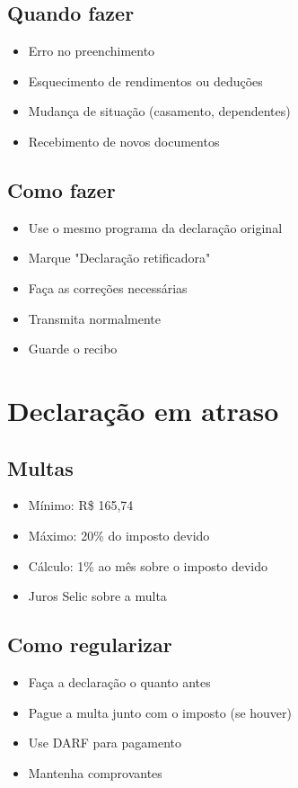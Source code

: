 \documentclass[12pt,a4paper]{article}
\begin{document}
\subsection{Quando fazer}
\begin{itemize}
    \item Erro no preenchimento
    \item Esquecimento de rendimentos ou deduções
    \item Mudança de situação (casamento, dependentes)
    \item Recebimento de novos documentos
\end{itemize}

\subsection{Como fazer}
\begin{itemize}
    \item Use o mesmo programa da declaração original
    \item Marque "Declaração retificadora"
    \item Faça as correções necessárias
    \item Transmita normalmente
    \item Guarde o recibo
\end{itemize}

\section{Declaração em atraso}

\subsection{Multas}
\begin{itemize}
    \item Mínimo: R\$ 165,74
    \item Máximo: 20\% do imposto devido
    \item Cálculo: 1\% ao mês sobre o imposto devido
    \item Juros Selic sobre a multa
\end{itemize}

\subsection{Como regularizar}
\begin{itemize}
    \item Faça a declaração o quanto antes
    \item Pague a multa junto com o imposto (se houver)
    \item Use DARF para pagamento
    \item Mantenha comprovantes
\end{itemize}
\end{document}
